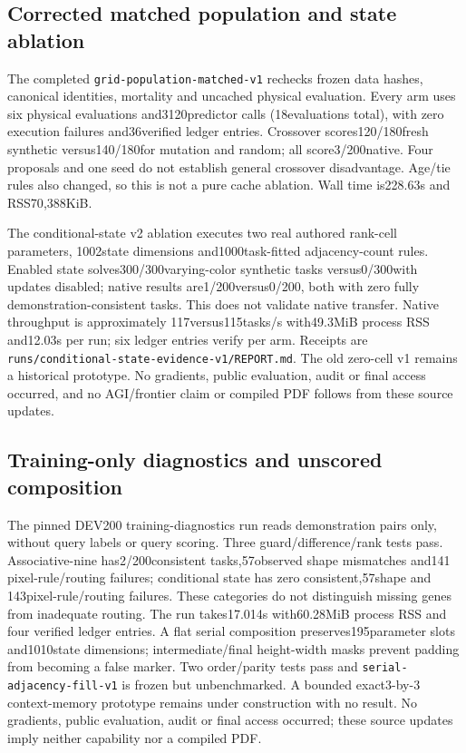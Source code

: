 \documentclass[11pt]{article}
\begin{document}
\subsection{Corrected matched population and state ablation}
The completed \texttt{grid-population-matched-v1} rechecks frozen data hashes,
canonical identities, mortality and uncached physical evaluation. Every arm uses
six physical evaluations and3120predictor calls (18evaluations total), with zero
execution failures and36verified ledger entries. Crossover scores120/180fresh
synthetic versus140/180for mutation and random; all score3/200native. Four proposals
and one seed do not establish general crossover disadvantage. Age/tie rules also
changed, so this is not a pure cache ablation. Wall time is228.63s and RSS70{,}388KiB.

The conditional-state v2 ablation executes two real authored rank-cell parameters,
1002state dimensions and1000task-fitted adjacency-count rules. Enabled state
solves300/300varying-color synthetic tasks versus0/300with updates disabled;
native results are1/200versus0/200, both with zero fully demonstration-consistent
tasks. This does not validate native transfer. Native throughput is approximately
117versus115tasks/s with49.3MiB process RSS and12.03s per run; six ledger entries
verify per arm. Receipts are \texttt{runs/conditional-state-evidence-v1/REPORT.md}.
The old zero-cell v1 remains a historical prototype. No gradients, public
evaluation, audit or final access occurred, and no AGI/frontier claim or compiled
PDF follows from these source updates.

\subsection{Training-only diagnostics and unscored composition}
The pinned DEV200 training-diagnostics run reads demonstration pairs only,
without query labels or query scoring. Three guard/difference/rank tests pass.
Associative-nine has2/200consistent tasks,57observed shape mismatches and141
pixel-rule/routing failures; conditional state has zero consistent,57shape and
143pixel-rule/routing failures. These categories do not distinguish missing
genes from inadequate routing. The run takes17.014s with60.28MiB process RSS
and four verified ledger entries.
A flat serial composition preserves195parameter slots and1010state dimensions;
intermediate/final height-width masks prevent padding from becoming a false
marker. Two order/parity tests pass and \texttt{serial-adjacency-fill-v1} is
frozen but unbenchmarked. A bounded exact3-by-3 context-memory prototype remains
under construction with no result. No gradients, public evaluation, audit or
final access occurred; these source updates imply neither capability nor a compiled PDF.
\end{document}
